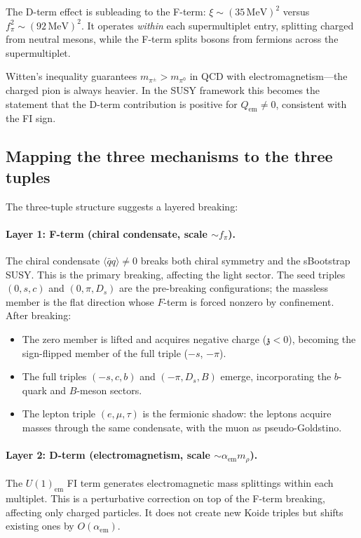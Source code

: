 \documentclass[12pt,a4paper]{article}
\newcommand{\MeV}{\,\text{MeV}}
\newcommand{\qqbar}{\langle\bar{q}q\rangle}
\newcommand{\zch}{\mathfrak{z}}
\begin{document}
The D-term effect is subleading to the F-term: 
$\xi \sim (35\MeV)^2$ versus $f_\pi^2 \sim (92\MeV)^2$. It 
operates \emph{within} each supermultiplet entry, splitting charged 
from neutral mesons, while the F-term splits bosons from fermions 
across the supermultiplet.

Witten's inequality \cite{Witten1983} guarantees 
$m_{\pi^\pm} > m_{\pi^0}$ in QCD with electromagnetism---the 
charged pion is always heavier. In the SUSY framework this 
becomes the statement that the D-term contribution is positive 
for $Q_{\text{em}} \neq 0$, consistent with the FI sign.

\subsection{Mapping the three mechanisms to the three tuples}
\label{subsec:mapping}

The three-tuple structure suggests a layered breaking:

\paragraph{Layer 1: F-term (chiral condensate, scale $\sim f_\pi$).}
The chiral condensate $\qqbar \neq 0$ breaks both chiral symmetry 
and the sBootstrap SUSY. This is the primary breaking, affecting 
the light sector. The seed triples $(0, s, c)$ and $(0, \pi, D_s)$ 
are the pre-breaking configurations; the massless member is the flat 
direction whose $F$-term is forced nonzero by confinement. After 
breaking:
\begin{itemize}
\item The zero member is lifted and acquires negative charge 
($\zch < 0$), becoming the sign-flipped member of the full triple 
($-s$, $-\pi$).
\item The full triples $(-s,c,b)$ and $(-\pi, D_s, B)$ emerge, 
incorporating the $b$-quark and $B$-meson sectors.
\item The lepton triple $(e, \mu, \tau)$ is the fermionic shadow: 
the leptons acquire masses through the same condensate, with the 
muon as pseudo-Goldstino.
\end{itemize}

\paragraph{Layer 2: D-term (electromagnetism, scale $\sim \alpha_{\text{em}} m_\rho$).}
The $U(1)_{\text{em}}$ FI term generates electromagnetic mass 
splittings within each multiplet. This is a perturbative correction 
on top of the F-term breaking, affecting only charged particles. 
It does not create new Koide triples but shifts existing ones by 
$O(\alpha_{\text{em}})$.
\end{document}
